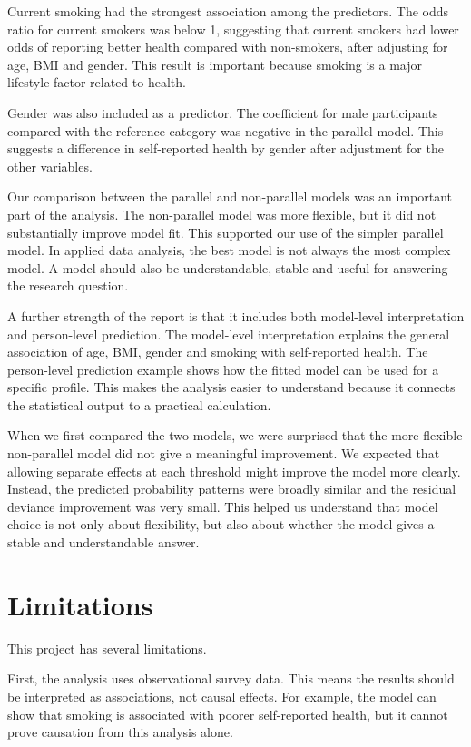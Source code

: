 \documentclass{article}
\begin{document}
Current smoking had the strongest association among the predictors. The
odds ratio for current smokers was below 1, suggesting that current
smokers had lower odds of reporting better health compared with
non-smokers, after adjusting for age, BMI and gender. This result is
important because smoking is a major lifestyle factor related to health.

Gender was also included as a predictor. The coefficient for male
participants compared with the reference category was negative in the
parallel model. This suggests a difference in self-reported health by
gender after adjustment for the other variables.

Our comparison between the parallel and non-parallel models was an
important part of the analysis. The non-parallel model was more
flexible, but it did not substantially improve model fit. This supported
our use of the simpler parallel model. In applied data analysis, the
best model is not always the most complex model. A model should also be
understandable, stable and useful for answering the research question.

A further strength of the report is that it includes both model-level
interpretation and person-level prediction. The model-level
interpretation explains the general association of age, BMI, gender and
smoking with self-reported health. The person-level prediction example
shows how the fitted model can be used for a specific profile. This
makes the analysis easier to understand because it connects the
statistical output to a practical calculation.

When we first compared the two models, we were surprised that the more
flexible non-parallel model did not give a meaningful improvement. We
expected that allowing separate effects at each threshold might improve
the model more clearly. Instead, the predicted probability patterns were
broadly similar and the residual deviance improvement was very small.
This helped us understand that model choice is not only about
flexibility, but also about whether the model gives a stable and
understandable answer.

\section{Limitations}\label{limitations}

This project has several limitations.

First, the analysis uses observational survey data. This means the
results should be interpreted as associations, not causal effects. For
example, the model can show that smoking is associated with poorer
self-reported health, but it cannot prove causation from this analysis
alone.
\end{document}
